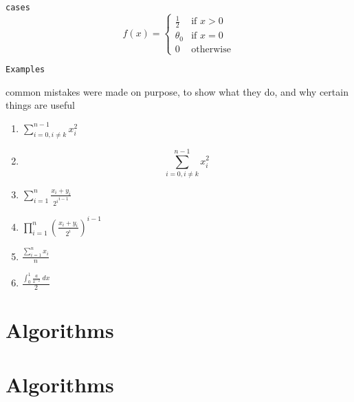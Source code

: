\documentclass[11pt, oneside]{article}   	%
\newcommand{\bp}[1]{\left( #1 \right)}
\begin{document}
\texttt{cases}
\[
f(x) = \begin{cases}
    \frac{1}{2} &\text{if } x > 0 \\
    \theta_0    &\text{if } x = 0 \\
    0           &\text{otherwise}
\end{cases}
\]

\newpage
\begin{center}
\texttt{Examples}

\tiny{common mistakes were made on purpose, to show what they do, and why certain things are useful}
\end{center}
\begin{enumerate}[(1)]
    \item $\sum_{i=0,i\ne k}^{n-1} x_i^2$
    \item \[\sum_{i=0,i\ne k}^{n-1} x_i^2\]
    \item $\sum_{i=1}^n \frac{x_i+y_i}{{2^i}^{i-1}}$
    \item $\prod_{i=1}^n \bp{\frac{x_i+y_i}{2^i}}^{i-1}$
    \item $\frac{\sum_{i=1}^n x_i}{n}$
    \item $\frac{\int_0^1 \frac{a}{x^{-2}} \ dx}{2}$
\end{enumerate}




\newpage


\section{Algorithms} \noindent

\section{Algorithms} \noindent
\end{document}
